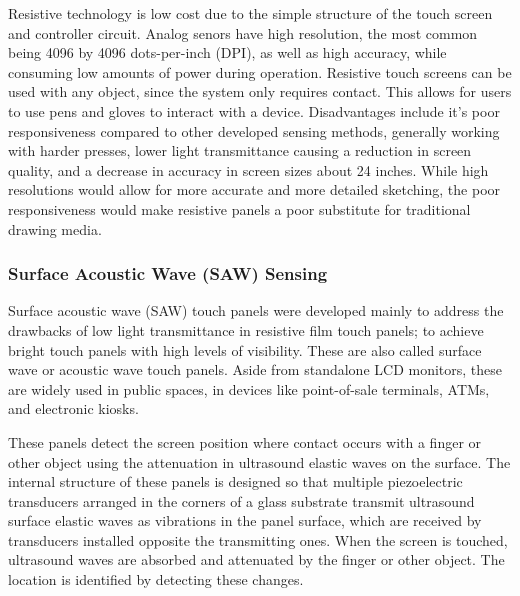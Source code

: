 \documentclass[11pt]{report}
\begin{document}
Resistive technology is low cost due to the simple structure of the touch screen and controller circuit.
Analog senors have high resolution, the most common being 4096 by 4096 dots-per-inch (DPI), as well as high accuracy, while consuming low amounts of power during operation.
Resistive touch screens can be used with any object, since the system only requires contact. 
This allows for users to use pens and gloves to interact with a device.
Disadvantages include it's poor responsiveness compared to other developed sensing methods, generally working with harder presses, lower light transmittance causing a reduction in screen quality, and a decrease in accuracy in screen sizes about 24 inches.
While high resolutions would allow for more accurate and more detailed sketching, the poor responsiveness would make resistive panels a poor substitute for traditional drawing media.

 
\subsubsection{Surface Acoustic Wave (SAW) Sensing}

Surface acoustic wave (SAW) touch panels were developed mainly to address the drawbacks of low light transmittance in resistive film touch panels; to achieve bright touch panels with high levels of visibility. 
These are also called surface wave or acoustic wave touch panels. 
Aside from standalone LCD monitors, these are widely used in public spaces, in devices like point-of-sale terminals, ATMs, and electronic kiosks.

These panels detect the screen position where contact occurs with a finger or other object using the attenuation in ultrasound elastic waves on the surface. 
The internal structure of these panels is designed so that multiple piezoelectric transducers arranged in the corners of a glass substrate transmit ultrasound surface elastic waves as vibrations in the panel surface, which are received by transducers installed opposite the transmitting ones. 
When the screen is touched, ultrasound waves are absorbed and attenuated by the finger or other object. 
The location is identified by detecting these changes.
\end{document}
